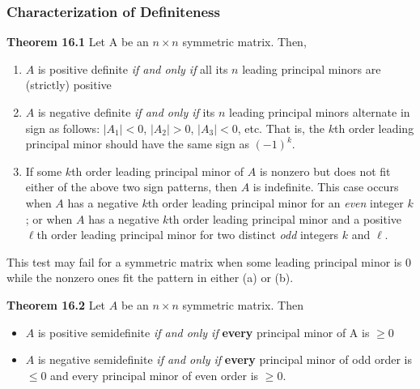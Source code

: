 \documentclass[9pt,aspectratio=169]{beamer}
\begin{document}
\begin{frame}[allowframebreaks]
	\frametitle{Characterization of Definiteness}
	\begin{block}{\textbf{Theorem 16.1}}
        Let A be an $n\times n$ symmetric matrix. Then,
        \begin{enumerate}
            \item[(a)] $A$ is positive definite \emph{if and only if} all its $n$
            leading principal minors are (strictly) positive
            \item[(b)] $A$ is negative definite \emph{if and only if} its $n$
            leading principal minors alternate in sign as follows: $|A_1|<0$,
            $|A_2|>0$, $|A_3|<0$, etc. That is, the $k$th order leading principal
            minor should have the same sign as $(-1)^k$.
            \item[(c)] If some $k$th order leading principal minor of $A$ is
            nonzero but does not fit either of the above two sign patterns,
            then $A$ is indefinite. This case occurs when $A$ has a negative
            $k$th order leading principal minor for an \emph{even} integer
            $k$; or when $A$ has a negative $k$th order leading principal
            minor and a positive $\ell$th order leading principal minor for
            two distinct \emph{odd} integers $k$ and $\ell$.
        \end{enumerate}
    \end{block}
    This test may fail for a symmetric matrix when some leading principal
    minor is 0 while the nonzero ones fit the pattern in either (a) or (b).

    \framebreak
	\begin{block}{\textbf{Theorem 16.2}}
		Let $A$ be an $n\times n$ symmetric	matrix. Then
		\begin{itemize}
			\item  $A$ is positive semidefinite \emph{if and only if}
			\textbf{every} principal minor of A is $\geq0$
			\item 	$A$ is negative semidefinite \emph{if and only if} \textbf{every} principal minor of odd order is $\leq 0$ and every
			principal minor of even order is $\geq0$.
		\end{itemize}
	\end{block}
\end{frame}
\end{document}
